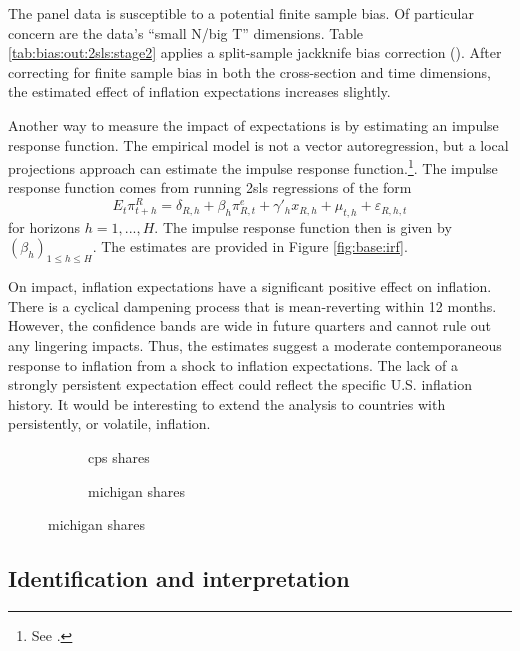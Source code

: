 \documentclass[12pt]{article}
\begin{document}
The panel data is susceptible to a potential finite sample bias. Of particular concern are the data's ``small N/big T'' dimensions. Table \ref{tab:bias:out:2sls:stage2} applies a split-sample jackknife bias correction (\cite{FernandezValWeidner:FE}). After correcting for finite sample bias in both the cross-section and time dimensions, the estimated effect of inflation expectations increases slightly.



Another way to measure the impact of expectations is by estimating an impulse response function. The empirical model is not a vector autoregression, but a local projections approach can estimate the impulse response function.\footnote{See \cite{Jorda:LP}.}. The impulse response function comes from running 2sls regressions of the form
$$ E_t\pi^R_{t+h} = \delta_{R,h} + \beta_h\pi^e_{R,t} + \gamma'_h x_{R,h} + \mu_{t,h} + \varepsilon_{R,h,t}$$
for horizons $h=1,...,H$. The impulse response function then is given by $\left(\beta_h\right)_{1\leq h\leq H}$. The estimates are provided in Figure \ref{fig:base:irf}.

On impact, inflation expectations have a significant positive effect on inflation. There is a cyclical dampening process that is mean-reverting within 12 months. However, the confidence bands are wide in future quarters and cannot rule out any lingering impacts. Thus, the estimates suggest a moderate contemporaneous response to inflation from a shock to inflation expectations. The lack of a strongly persistent expectation effect could reflect the specific U.S. inflation history. It would be interesting to extend the analysis to countries with persistently, or volatile, inflation.


\begin{figure}
\centering
\caption{Impulse responses}\label{fig:base:irf}
\begin{subfigure}[t]{0.475\textwidth}
\centering

\caption{cps shares}
\end{subfigure}
\quad
\begin{subfigure}[t]{0.475\textwidth}
\centering

\caption{michigan shares}
\end{subfigure}
\end{figure}

\subsection{Identification and interpretation}
\end{document}
